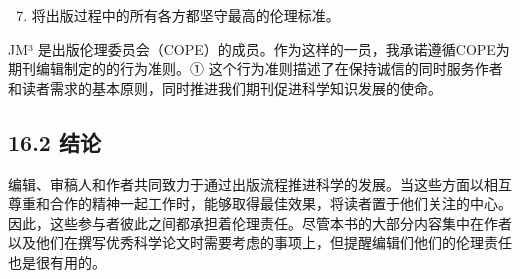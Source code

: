 \begin{enumerate}
  \setcounter{enumi}{6}
\item 将出版过程中的所有各方都坚守最高的伦理标准。
\end{enumerate}

JM³ 是出版伦理委员会（COPE）的成员。作为这样的一员，我承诺遵循COPE为期刊编辑制定的的行为准则。① 这个行为准则描述了在保持诚信的同时服务作者和读者需求的基本原则，同时推进我们期刊促进科学知识发展的使命。

\subsection*{16.2 结论}
编辑、审稿人和作者共同致力于通过出版流程推进科学的发展。当这些方面以相互尊重和合作的精神一起工作时，能够取得最佳效果，将读者置于他们关注的中心。因此，这些参与者彼此之间都承担着伦理责任。尽管本书的大部分内容集中在作者以及他们在撰写优秀科学论文时需要考虑的事项上，但提醒编辑们他们的伦理责任也是很有用的。

